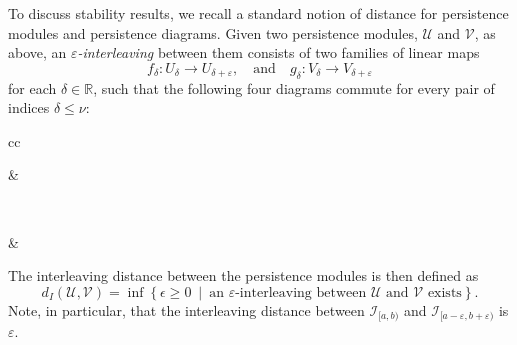 \documentclass[8pt,a4paper,oneside,english,english]{article}
\theoremstyle{plain}
\theoremstyle
{plain}
\theoremstyle{definition}
\newcommand{\R}{\mathbb{R}}
\newcommand{\setdef}[2]{\left\{{#1} \ \middle|\ {#2}\right\}}
\newcommand{\dint}{d_I}
\newcommand{\intmod}[1]{\mathcal{I}_{#1}}
\begin{document}
To discuss stability results, we recall a standard notion of distance for persistence modules and persistence diagrams. Given two persistence modules, $\mathcal{U}$ and $\mathcal{V}$, as above, an {\em $\varepsilon$-interleaving} between them consists of two families of linear maps 
\[
f_{\delta}\colon U_\delta\to U_{\delta+\varepsilon}, \quad \text{and} \quad g_{\delta}\colon V_\delta\to V_{\delta+\varepsilon}
\]
for each $\delta\in\R$, such that the following four diagrams commute for every pair of indices $\delta\leq\nu$:

\begin{tabular}{cc}
    &
    \vspace{5mm}\\
    &
\end{tabular}

\noindent The interleaving distance between the persistence modules is then defined as \[
    \dint(\mathcal{U}, \mathcal{V}) = \inf\setdef{\epsilon\geq 0}{\text{an $\varepsilon$-interleaving between $\mathcal{U}$ and $\mathcal{V}$ exists}}.
\]
Note, in particular, that the interleaving distance between $\intmod{[a,b)}$ and $\intmod{[a-\varepsilon,b+\varepsilon)}$ is $\varepsilon$.
\end{document}
